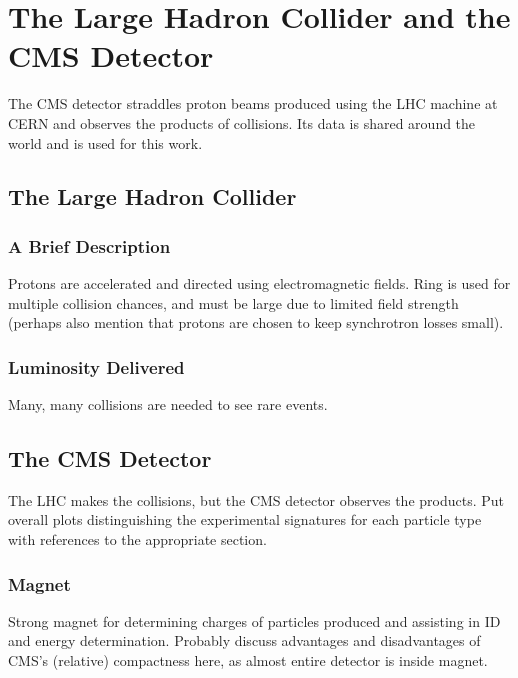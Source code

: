 \chapter{The Large Hadron Collider and the CMS Detector}

The CMS detector straddles proton beams produced using the LHC machine at CERN and observes the products of collisions.
Its data is shared around the world and is used for this work.

\section{The Large Hadron Collider} \label{sec:LHC}

  \subsection{A Brief Description} \label{sec:LHCdescription}

  Protons are accelerated and directed using electromagnetic fields.
  Ring is used for multiple collision chances, and must be large due to limited field strength (perhaps also mention that protons are chosen to keep synchrotron losses small).

  \subsection{Luminosity Delivered} \label{sec:lumi}

  Many, many collisions are needed to see rare events.

\section{The CMS Detector} \label{sec:CMS}

  The LHC makes the collisions, but the CMS detector observes the products.
  Put overall plots distinguishing the experimental signatures for each particle type with references to the appropriate section.

  \subsection{Magnet} \label{sec:magnet}

  Strong magnet for determining charges of particles produced and assisting in ID and energy determination.
  Probably discuss advantages and disadvantages of CMS's (relative) compactness here, as almost entire detector is inside magnet.

